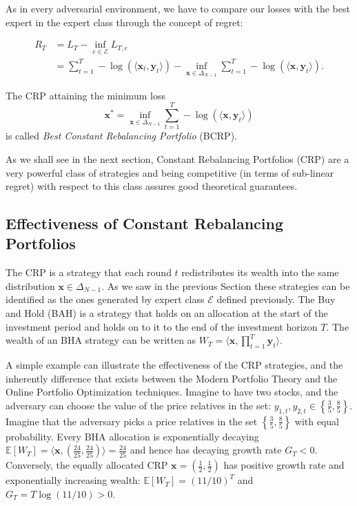 As in every adversarial environment, we have to compare our losses with the best expert in the expert class through the concept of regret:

\begin{align}
R_T&=L_T-\inf\limits_{e\in \mathcal E}L_{T,e}\\
&=\sum\limits_{t=1}^T-\log(\langle\mathbf x_t,\mathbf y_t\rangle)-\inf\limits_{\mathbf x\in\Delta_{N-1}}\sum\limits_{t=1}^T-\log(\langle\mathbf x,\mathbf y_t\rangle).
\end{align}

The CRP attaining the minimum loss 
$$\mathbf x^*=\inf\limits_{\mathbf x \in \Delta_{N-1}}\sum\limits_{t=1}^T-\log(\langle\mathbf x,\mathbf y_t\rangle)$$
is called \emph{Best Constant Rebalancing Portfolio} (BCRP).

As we shall see in the next section, Constant Rebalancing Portfolios (CRP) are a very powerful class of strategies and being competitive (in terms of sub-linear regret) with respect to this class assures good theoretical guarantees. 

\subsection{Effectiveness of Constant Rebalancing Portfolios}\label{sec:OPO}

The CRP is a strategy that each round $t$ redistributes its wealth into the same distribution $\mathbf x\in\Delta_{N-1}$. As we saw in the previous Section these strategies can be identified as the ones generated by expert class $\mathcal E$ defined previously.
The Buy and Hold (BAH) is a strategy that holds on an allocation at the start of the investment period and holds on to it to the end of the investment horizon $T$. The wealth of an BHA strategy can be written as $W_T=\langle\mathbf x, \prod_{t=1}^T \mathbf y_t\rangle$.

A simple example can illustrate the effectiveness of the CRP strategies, and the inherently difference that exists between the Modern Portfolio Theory and the Online Portfolio Optimization techniques.
Imagine to have two stocks, and the adversary can choose the value of the price relatives in the set: $y_{1,t},y_{2,t}\in\left\{\frac{3}{5},\frac{8}{5}\right\}$. Imagine that the adversary picks a price relatives in the set $\left\{\frac{3}{5},\frac{8}{5}\right\}$ with equal probability. Every BHA allocation is exponentially decaying $\mathbb E[W_T]=\langle \mathbf x, (\frac{24}{25},\frac{24}{25})\rangle=\frac{24}{25}$ and hence has decaying growth rate $G_T<0$. Conversely, the equally allocated CRP $\mathbf x=(\frac{1}{2},\frac{1}{2})$ has positive growth rate and exponentially increasing wealth: $\mathbb E[W_T]=(11/10)^T$ and $G_T=T\log(11/10)>0$.

